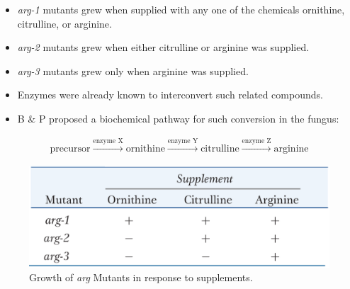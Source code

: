 \documentclass[11pt,dvipsnames,ignorenonframetext,aspectratio=169]{beamer}
\providecommand{\tightlist}{%
  \setlength{\itemsep}{0pt}\setlength{\parskip}{0pt}}
\begin{document}
\begin{frame}{}
\protect\hypertarget{section-7}{}
\begin{itemize}
\tightlist
\item
  \emph{arg-1} mutants grew when supplied with any one of the chemicals
  ornithine, citrulline, or arginine.
\item
  \emph{arg-2} mutants grew when either citrulline or arginine was
  supplied.
\item
  \emph{arg-3} mutants grew only when arginine was supplied.
\item
  Enzymes were already known to interconvert such related compounds.
\item
  B \& P proposed a biochemical pathway for such conversion in the
  fungus:
\end{itemize}

\[
\begin{aligned}
\textrm{precursor} \xrightarrow{\text{enzyme X}} \textrm{ornithine} \xrightarrow{\text{enzyme Y}} \textrm{citrulline} \xrightarrow{\text{enzyme Z}} \textrm{arginine}
\end{aligned}
\]

\begin{figure}
\includegraphics[width=0.4\linewidth]{./../images/mutant_growth_supplements} \caption{Growth of \textit{arg} Mutants in response to supplements.}\label{fig:mutants-supplements}
\end{figure}
\end{frame}
\end{document}
